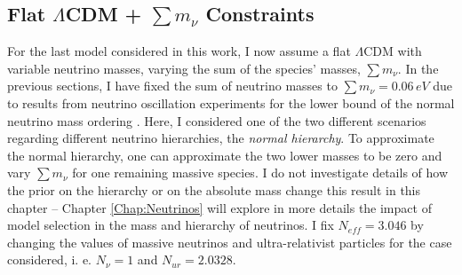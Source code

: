 \subsection{Flat $\Lambda$CDM + $\sum m_\nu$ Constraints}\label{Sec:nCDM}
For the last model considered in this work, I now assume a flat $\Lambda$CDM with variable neutrino masses, varying the sum of the species' masses, $\sum m_{\nu}$. In the previous sections, I have fixed the sum of neutrino masses to $\sum m_{\nu} = 0.06 \, eV$ due to results from neutrino oscillation experiments for the lower bound of the normal neutrino mass ordering \citep{2003HannestadNeutrino,2006NeutrinoReview,2016JCAP...11..035H}. Here, I considered one of the two different scenarios regarding different neutrino hierarchies, the \textit{normal hierarchy}.  To approximate the normal hierarchy, one can approximate the two lower masses to be zero and vary $\sum m_{\nu}$ for one remaining massive species. I do not investigate details of how the prior on the hierarchy or on the absolute mass change this result in this chapter  -- Chapter \ref{Chap:Neutrinos} will explore in more details the impact of model selection in the mass and hierarchy of neutrinos. I fix $N_{eff} = 3.046$ by changing the values of massive neutrinos and ultra-relativist particles for the case considered, i. e. $N_{\nu} = 1$ and $N_{ur} = 2.0328$.

